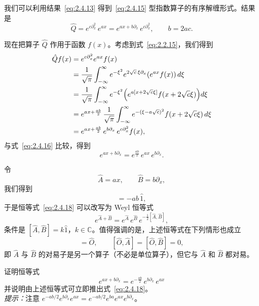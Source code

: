 我们可以利用结果~\eqref{eq:2.4.13} 得到~\eqref{eq:2.4.15} 型指数算子的有序解缠形式。结果是
\begin{equation}
\hat{Q}=e^{c\partial_{x}^{2}}\,e^{a x}
=e^{a x+b\partial_{x}}\,e^{c\partial_{x}^{2}},\qquad b=2ac.
\label{eq:2.4.16}
\end{equation}

现在把算子 $\hat{Q}$ 作用于函数 $f(x)$。考虑到式~\eqref{eq:2.2.15}，我们得到
\begin{align}
\hat{Q}f(x)&=e^{c\partial_{x}^{2}}e^{a x}f(x)\notag\\
&=\frac{1}{\sqrt{\pi}}\int_{-\infty}^{\infty}e^{-\xi^{2}}
e^{2\sqrt{c}\,\xi\partial_{x}}\!\left(e^{a x}f(x)\right)d\xi\notag\\
&=\frac{1}{\sqrt{\pi}}\int_{-\infty}^{\infty}e^{-\xi^{2}}
\Bigl(e^{a[x+2\sqrt{c}\xi]}f(x+2\sqrt{c}\xi)\Bigr)d\xi\notag\\
&=e^{a x+\frac{a b}{2}}\,
\frac{1}{\sqrt{\pi}}\int_{-\infty}^{\infty}e^{-(\xi-a\sqrt{c})^{2}}
f(x+2\sqrt{c}\xi)\,d\xi\notag\\
&=e^{a x+\frac{a b}{2}}\,e^{b\partial_{x}}\,e^{c\partial_{x}^{2}}f(x),
\label{eq:2.4.17}
\end{align}
与式~\eqref{eq:2.4.16} 比较，得到
\begin{equation}
e^{a x+b\partial_{x}}=e^{\frac{a b}{2}}\,e^{a x}\,e^{b\partial_{x}}.
\label{eq:2.4.18}
\end{equation}

令
\begin{equation}
\hat{A}=a x,\qquad \hat{B}=b\partial_{x},
\label{eq:2.4.19}
\end{equation}
我们得到
\begin{equation}
[\hat{A},\hat{B}]=-ab\,\hat{1},
\label{eq:2.4.20}
\end{equation}
于是恒等式~\eqref{eq:2.4.18} 可以改写为 Weyl 恒等式
\begin{equation}
e^{\hat{A}+\hat{B}}=e^{\hat{A}}\,e^{\hat{B}}\,e^{-\frac{1}{2}[\hat{A},\hat{B}]},
\label{eq:2.4.21}
\end{equation}
条件是 $[\hat{A},\hat{B}]=k\hat{1}$，$k\in\mathbb{C}$。值得强调的是，上述恒等式在下列情形也成立
\begin{equation}
[\hat{A},\hat{B}]=\hat{O},\qquad
[\hat{O},\hat{A}]=[\hat{O},\hat{B}]=0,
\label{eq:2.4.22}
\end{equation}
即 $\hat{A}$ 与 $\hat{B}$ 的对易子是另一个算子（不必是单位算子），但它与 $\hat{A}$ 和 $\hat{B}$ 都对易。

\begin{exercise}
证明恒等式
\begin{equation}
e^{a x+b\partial_{x}}=e^{-\frac{a b}{2}}\,e^{b\partial_{x}}\,e^{a x}
\label{eq:2.4.23}
\end{equation}
并说明由上述恒等式可立即推出式~\eqref{eq:2.4.18}。\\
\textit{提示：}注意 $e^{-ab/2}e^{b\partial_{x}}e^{ax}
=e^{-ab/2}e^{ba}e^{ax}e^{b\partial_{x}}$。
\end{exercise}


